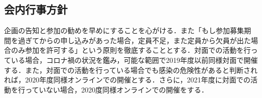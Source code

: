 \subsection*{会内行事方針}

企画の告知と参加の勧めを早めにすることを心がける．また「もし参加募集期間を過ぎてからの申し込みがあった場合，定員不足，また定員から欠員が出た場合のみ参加を許可する」という原則を徹底することとする．対面での活動を行っている場合，コロナ禍の状況を鑑み，可能な範囲で2019年度以前同様対面で開催する．また，対面での活動を行っている場合でも感染の危険性があると判断されれば，2020年度同様オンラインでの開催とする．さらに，2021年度に対面での活動を行っていない場合，2020度同様オンラインでの開催をする．
